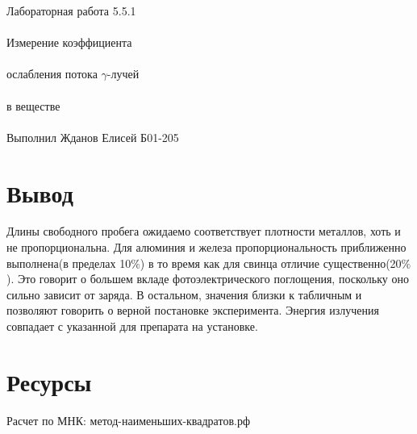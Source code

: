 \documentclass{astroedu-lab}
\begin{document}
\begin{problem}{\huge Лабораторная работа 5.5.1\\\\Измерение коэффициента\\\\ослабления потока $\gamma$-лучей\\\\в веществе\\\\Выполнил Жданов Елисей Б01-205}

\section{Вывод}

Длины свободного пробега ожидаемо соответствует плотности металлов, хоть и не пропорциональна. Для алюминия и железа пропорциональность приближенно выполнена(в пределах 10$\%$) в то время как для свинца отличие существенно(20$\%$). Это говорит о большем вкладе фотоэлектрического поглощения, поскольку оно сильно зависит от заряда. В остальном, значения близки к табличным и позволяют говорить о верной постановке эксперимента. Энергия излучения совпадает с указанной для препарата на установке. 


\section{Ресурсы}

Расчет по МНК: метод-наименьших-квадратов.рф


\end{problem}
\end{document}
